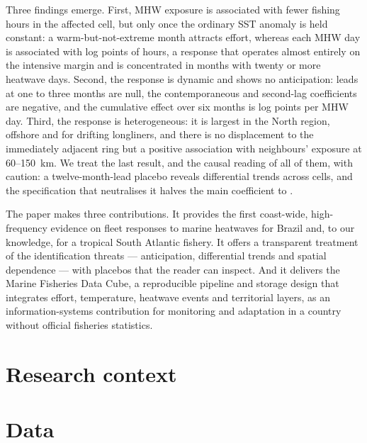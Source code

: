 \documentclass[12pt,a4paper]{article}
\begin{document}
Three findings emerge. First, MHW exposure is associated with fewer fishing hours in the affected cell, but only once the ordinary SST anomaly is held constant: a warm-but-not-extreme month attracts effort, whereas each MHW day is associated with \bMhwMain{} log points of hours, a response that operates almost entirely on the intensive margin and is concentrated in months with twenty or more heatwave days. Second, the response is dynamic and shows no anticipation: leads at one to three months are null, the contemporaneous and second-lag coefficients are negative, and the cumulative effect over six months is \bCumSixIC{} log points per MHW day. Third, the response is heterogeneous: it is largest in the North region, offshore and for drifting longliners, and there is no displacement to the immediately adjacent ring but a positive association with neighbours' exposure at 60--150~km. We treat the last result, and the causal reading of all of them, with caution: a twelve-month-lead placebo reveals differential trends across cells, and the specification that neutralises it halves the main coefficient to \bMhwCellTrend{}.

The paper makes three contributions. It provides the first coast-wide, high-frequency evidence on fleet responses to marine heatwaves for Brazil and, to our knowledge, for a tropical South Atlantic fishery. It offers a transparent treatment of the identification threats --- anticipation, differential trends and spatial dependence --- with placebos that the reader can inspect. And it delivers the Marine Fisheries Data Cube, a reproducible pipeline and storage design that integrates effort, temperature, heatwave events and territorial layers, as an information-systems contribution for monitoring and adaptation in a country without official fisheries statistics.

\section{Research context}\label{sec:context}

\section{Data}\label{sec:data}
\end{document}
